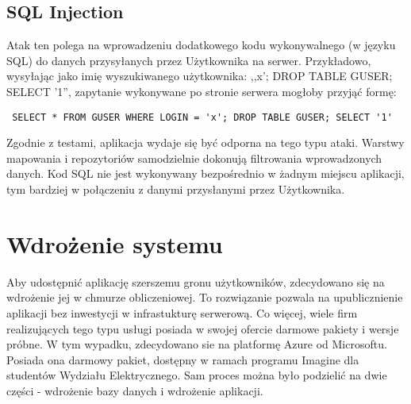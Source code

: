 \documentclass[a4paper,12pt,twoside,openany]{report}
\begin{document}
\section{SQL Injection}
Atak ten \cite{Owasp} polega na wprowadzeniu dodatkowego kodu wykonywalnego (w języku SQL) do danych przysyłanych przez Użytkownika na serwer. Przykładowo, wysyłając jako imię wyszukiwanego użytkownika:  ,,x'; DROP TABLE GUSER; SELECT '1'', zapytanie wykonywane po stronie serwera mogłoby przyjąć formę:
\begin{lstlisting}
 SELECT * FROM GUSER WHERE LOGIN = 'x'; DROP TABLE GUSER; SELECT '1'
\end{lstlisting}
Zgodnie z testami, aplikacja wydaje się być odporna na tego typu ataki. Warstwy mapowania i repozytoriów samodzielnie dokonują filtrowania wprowadzonych danych. Kod SQL nie jest wykonywany bezpośrednio w żadnym miejscu aplikacji, tym bardziej w połączeniu z danymi przysłanymi przez Użytkownika.

\chapter{Wdrożenie systemu}
Aby udostępnić aplikację szerszemu gronu użytkowników, zdecydowano się na wdrożenie jej w chmurze obliczeniowej. To rozwiązanie pozwala na upublicznienie aplikacji bez inwestycji w infrastukturę serwerową. Co więcej, wiele firm realizujących tego typu usługi posiada w swojej ofercie darmowe pakiety i wersje próbne. W tym wypadku, zdecydowano sie na platformę Azure od Microsoftu. Posiada ona darmowy pakiet, dostępny w ramach programu Imagine dla studentów Wydziału Elektrycznego. Sam proces można było podzielić na dwie części - wdrożenie bazy danych i wdrożenie aplikacji.
\end{document}
